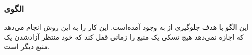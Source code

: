 \subsubsection{الگوی }
\label{scheduleSimLockingSec}
\begin{RTL}
این الگو با هدف جلوگیری از  به وجود آمده‌است.
این کار را به این روش انجام می‌دهد که اجازه نمی‌دهد هیچ تسکی یک منبع
را زمانی قفل کند که خود منتظر آزادشدن یک منبع دیگر است.
\end{RTL}
